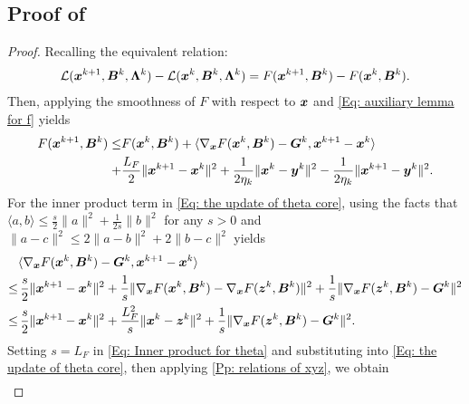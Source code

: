 \subsection{Proof of }
\label{Subsubsec: proof x progress SGDM}

\begin{proof}
    Recalling the equivalent relation:
    \begin{align}
        \label{Eq: the update of x one progress in StoM}\mathcal{L}(\bm{x}^{k+1}, \bm{B}^{k}, \bm{\Lambda}^{k}) - \mathcal{L}(\bm{x}^{k}, \bm{B}^{k}, \bm{\Lambda}^{k}) = F(\bm{x}^{k+1}, \bm{B}^{k}) - F(\bm{x}^{k}, \bm{B}^{k}).
    \end{align}
    Then, applying the smoothness of $F$ with respect to $\bm{x}$ and \eqref{Eq: auxiliary lemma for f}
    yields
    \begin{align}
        \label{Eq: the update of theta core}F(\bm{x}^{k+1}, \bm{B}^{k}) \leq & F(\bm{x}^{k}, \bm{B}^{k}) + \langle \nabla_{\bm{x}}F(\bm{x}^{k}, \bm{B}^{k}) - \bm{G}^{k}, \bm{x}^{k+1}- \bm{x}^{k}\rangle \notag                              \\
        +                                                                 & \frac{L_{F}}{2}\|\bm{x}^{k+1}- \bm{x}^{k}\|^{2}+ \frac{1}{2\eta_{k}}\|\bm{x}^{k}- \bm{y}^{k}\|^{2}- \frac{1}{2\eta_{k}}\|\bm{x}^{k+1}- \bm{y}^{k}\|^{2}.
    \end{align}
    For the inner product term in \eqref{Eq: the update of theta core}, using
    the facts that
    $\langle a, b \rangle \leq \frac{s}{2}\|a\|^{2}+ \frac{1}{2s}\|b\|^{2}$ for
    any $s > 0$ and $\| a - c \|^{2}\leq 2\|a - b \|^{2}+ 2\|b -c\|^{2}$ yields
    { \begin{align}\label{Eq: Inner product for theta}&\langle \nabla_{\bm{x}}F(\bm{x}^{k}, \bm{B}^{k}) - \bm{G}^{k}, \bm{x}^{k+1}- \bm{x}^{k}\rangle \notag \\ \leq&\,\frac{s}{2}\|\bm{x}^{k+1}- \bm{x}^{k}\|^{2}+ \frac{1}{s}\|\nabla_{\bm{x}}F(\bm{x}^{k}, \bm{B}^{k}) - \nabla_{\bm{x}}F(\bm{z}^{k}, \bm{B}^{k}) \|^{2}+ \frac{1}{s}\|\nabla_{\bm{x}}F(\bm{z}^{k}, \bm{B}^{k}) - \bm{G}^{k}\|^{2}\notag \\ \leq&\, \frac{s}{2}\|\bm{x}^{k+1}- \bm{x}^{k}\|^{2}+ \frac{L^{2}_{F}}{s}\|\bm{x}^{k}- \bm{z}^{k}\|^{2}+ \frac{1}{s}\|\nabla_{\bm{x}}F(\bm{z}^{k}, \bm{B}^{k}) - \bm{G}^{k}\|^{2}.\end{align}}
    Setting $s = L_{F}$ in \eqref{Eq: Inner product for theta} and substituting into
    \eqref{Eq: the update of theta core}, then applying \cref{Pp: relations of xyz},
    we obtain
    \begin{align}

\end{align}
\end{proof}
